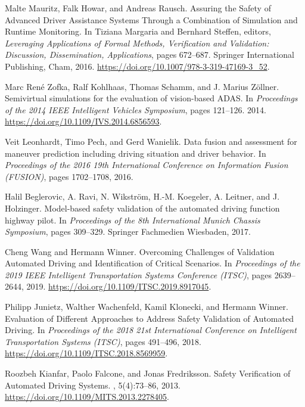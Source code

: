 \documentclass[lettersize,journal]{IEEEtran}
\begin{document}
\begin{thebibliography}{1}
Malte Mauritz, Falk Howar, and Andreas Rausch.
\newblock Assuring the Safety of Advanced Driver Assistance Systems Through a Combination of Simulation and Runtime Monitoring.
\newblock In Tiziana Margaria and Bernhard Steffen, editors, {\em Leveraging Applications of Formal Methods, Verification and Validation: Discussion, Dissemination, Applications}, pages 672--687. Springer International Publishing, Cham, 2016.
\newblock \url{https://doi.org/10.1007/978-3-319-47169-3_52}.

Marc René Zofka, Ralf Kohlhaas, Thomas Schamm, and J. Marius Zöllner.
\newblock Semivirtual simulations for the evaluation of vision-based ADAS.
\newblock In {\em Proceedings of the 2014 IEEE Intelligent Vehicles Symposium}, pages 121--126. 2014.
\newblock \url{https://doi.org/10.1109/IVS.2014.6856593}.

Veit Leonhardt, Timo Pech, and Gerd Wanielik.
\newblock Data fusion and assessment for maneuver prediction including driving situation and driver behavior.
\newblock In {\em Proceedings of the 2016 19th International Conference on Information Fusion (FUSION)}, pages 1702--1708, 2016.

Halil Beglerovic, A. Ravi, N. Wikström, H.-M. Koegeler, A. Leitner, and J. Holzinger.
\newblock Model-based safety validation of the automated driving function highway pilot.
\newblock In {\em Proceedings of the 8th International Munich Chassis Symposium}, pages 309--329. Springer Fachmedien Wiesbaden, 2017.


Cheng Wang and Hermann Winner.
\newblock Overcoming Challenges of Validation Automated Driving and Identification of Critical Scenarios.
\newblock In {\em Proceedings of the 2019 IEEE Intelligent Transportation Systems Conference (ITSC)}, pages 2639--2644, 2019.
\newblock \url{https://doi.org/10.1109/ITSC.2019.8917045}.


Philipp Junietz, Walther Wachenfeld, Kamil Klonecki, and Hermann Winner.
\newblock Evaluation of Different Approaches to Address Safety Validation of Automated Driving.
\newblock In {\em Proceedings of the 2018 21st International Conference on Intelligent Transportation Systems (ITSC)}, pages 491--496, 2018.
\newblock \url{https://doi.org/10.1109/ITSC.2018.8569959}.


Roozbeh Kianfar, Paolo Falcone, and Jonas Fredriksson.
\newblock Safety Verification of Automated Driving Systems.
, 5(4):73--86, 2013.
\newblock \url{https://doi.org/10.1109/MITS.2013.2278405}.


\end{thebibliography}
\end{document}
